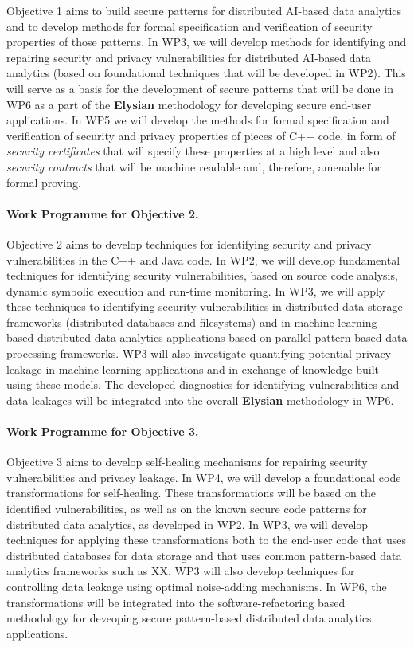 \documentclass[a4paper,11pt]{article}
\newcommand{\project}[1]{\textbf{#1}\xspace}
\newcommand{\SECURITY}{\project{Elysian}}
\newcommand{\TheProject}{\SECURITY}
\begin{document}
Objective 1 aims to build secure patterns for distributed AI-based data analytics and to develop methods for formal specification and verification of security properties of those patterns. In WP3, we will develop methods for identifying and repairing security and privacy vulnerabilities for distributed AI-based data analytics (based on foundational techniques that will be developed in WP2). This will serve as a basis for the development of secure patterns that will be done in WP6 as a part of the \TheProject{} methodology for developing secure end-user applications. In WP5 we will develop the methods for formal specification and verification of security and privacy properties of pieces of C++ code, in form of \emph{security certificates} that will specify these properties at a high level and also \emph{security contracts} that will be machine readable and, therefore, amenable for formal proving. 

\paragraph*{Work Programme for Objective 2.}

Objective 2 aims to develop techniques for identifying security and privacy vulnerabilities in the C++ and Java code. In WP2, we will develop fundamental techniques for identifying security vulnerabilities, based on source code analysis, dynamic symbolic execution and run-time monitoring. In WP3, we will apply these techniques to identifying security vulnerabilities in distributed data storage frameworks (distributed databases and filesystems) and in machine-learning based distributed data analytics applications based on parallel pattern-based data processing frameworks. WP3 will also investigate quantifying potential privacy leakage in machine-learning applications and in exchange of knowledge built using these models. The developed diagnostics for identifying vulnerabilities and data leakages will be integrated into the overall \TheProject{} methodology in WP6.

\paragraph{Work Programme for Objective 3.}

Objective 3 aims to develop self-healing mechanisms for repairing security vulnerabilities and privacy leakage. In WP4, we will develop a foundational code transformations for self-healing. These transformations will be based on the identified vulnerabilities, as well as on the known secure code patterns for distributed data analytics, as developed in WP2. In WP3, we will develop techniques for applying these transformations both to the end-user code that uses distributed databases for data storage and that uses common pattern-based data analytics frameworks such as XX. WP3 will also develop techniques for controlling data leakage using optimal noise-adding mechanisms. In WP6, the transformations will be integrated into the software-refactoring based methodology for deveoping secure pattern-based distributed data analytics applications. 
\end{document}
